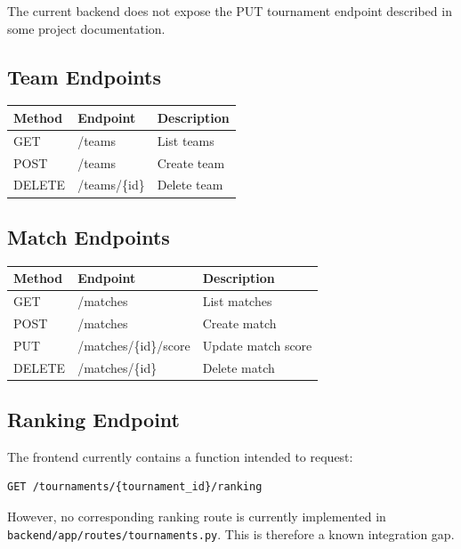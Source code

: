 \documentclass[12pt,a4paper]{article}
\begin{document}
The current backend does not expose the PUT tournament endpoint
described in some project documentation.

\subsection{Team Endpoints}

\begin{longtable}{lll}
\toprule
\textbf{Method} & \textbf{Endpoint} & \textbf{Description}\\
\midrule
\endhead
GET & /teams & List teams\\
POST & /teams & Create team\\
DELETE & /teams/\{id\} & Delete team\\
\bottomrule
\end{longtable}

\subsection{Match Endpoints}

\begin{longtable}{lll}
\toprule
\textbf{Method} & \textbf{Endpoint} & \textbf{Description}\\
\midrule
\endhead
GET & /matches & List matches\\
POST & /matches & Create match\\
PUT & /matches/\{id\}/score & Update match score\\
DELETE & /matches/\{id\} & Delete match\\
\bottomrule
\end{longtable}

\subsection{Ranking Endpoint}

The frontend currently contains a function intended to request:

\begin{lstlisting}
GET /tournaments/{tournament_id}/ranking
\end{lstlisting}

However, no corresponding ranking route is currently implemented in
\texttt{backend/app/routes/tournaments.py}. This is therefore a
known integration gap.

\end{document}
